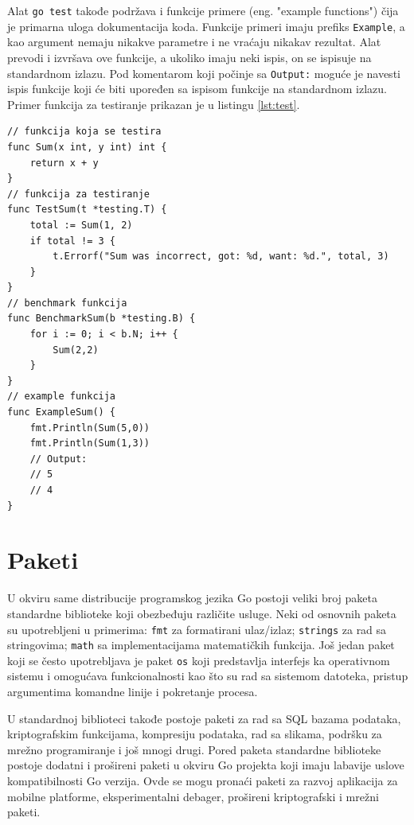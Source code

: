 \documentclass[12pt,oneside]{memoir}
\begin{document}
Alat \texttt{go test} takođe podržava i funkcije primere (eng. "example functions") čija je primarna uloga dokumentacija koda. Funkcije primeri imaju prefiks  \texttt{Example}, a kao argument nemaju nikakve parametre i ne vraćaju nikakav rezultat. Alat prevodi i izvršava ove funkcije, a ukoliko imaju neki ispis, on se ispisuje na standardnom izlazu. Pod komentarom koji počinje sa \texttt{Output:} moguće je navesti ispis funkcije koji će biti upoređen sa ispisom funkcije na standardnom izlazu. Primer funkcija za testiranje prikazan je u listingu \ref{lst:test}.

\begin{center}
\begin{lstlisting}[caption=Primer različitih tipova funkcija za testiranje, label={lst:test},  backgroundcolor=\color{background}]
// funkcija koja se testira
func Sum(x int, y int) int {  
	return x + y
}
// funkcija za testiranje
func TestSum(t *testing.T) {  
	total := Sum(1, 2)
	if total != 3 {
		t.Errorf("Sum was incorrect, got: %d, want: %d.", total, 3)
	}
}
// benchmark funkcija
func BenchmarkSum(b *testing.B) {
	for i := 0; i < b.N; i++ {
		Sum(2,2)
	}
}
// example funkcija
func ExampleSum() {
	fmt.Println(Sum(5,0))
	fmt.Println(Sum(1,3))
	// Output:
	// 5
	// 4
}

\end{lstlisting}
\end{center}

\section{Paketi}

U okviru same distribucije programskog jezika Go postoji veliki broj paketa standardne biblioteke koji obezbeđuju različite usluge. Neki od osnovnih paketa su upotrebljeni u primerima: \texttt{fmt} za formatirani ulaz/izlaz; \texttt{strings} za rad sa stringovima; \texttt{math} sa implementacijama matematičkih funkcija. Još jedan paket koji se često upotrebljava je paket \texttt{os} koji predstavlja interfejs ka operativnom sistemu i omogućava funkcionalnosti kao što su rad sa sistemom datoteka, pristup argumentima komandne linije i pokretanje procesa.

U standardnoj biblioteci takođe postoje paketi za rad sa SQL bazama podataka, kriptografskim funkcijama, kompresiju podataka, rad sa slikama,  podršku za mrežno programiranje i još mnogi drugi. Pored paketa standardne biblioteke postoje dodatni i prošireni paketi u okviru Go projekta koji imaju labavije uslove kompatibilnosti Go verzija. Ovde se mogu pronaći paketi za razvoj aplikacija za mobilne platforme, eksperimentalni debager, prošireni kriptografski i mrežni paketi. 
\end{document}
